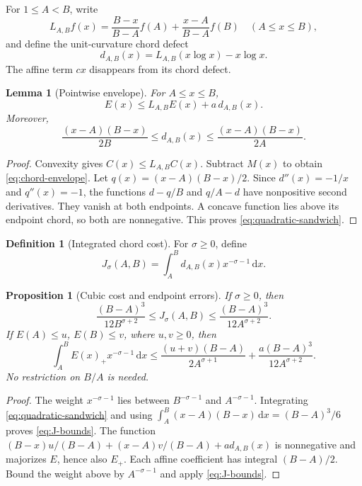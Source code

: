 \documentclass[11pt]{article}
\newtheorem{lemma}[theorem]{Lemma}
\newtheorem{proposition}[theorem]{Proposition}
\theoremstyle{definition}
\newtheorem{definition}[theorem]{Definition}
\newcommand{\dd}{\,\mathrm d}
\begin{document}
For \(1\leq A<B\), write
\[
 L_{A,B}f(x)=\frac{B-x}{B-A}f(A)+\frac{x-A}{B-A}f(B)
 \quad(A\leq x\leq B),
\]
and define the unit-curvature chord defect
\begin{equation}\label{eq:chord-defect}
 d_{A,B}(x)=L_{A,B}(x\log x)-x\log x.
\end{equation}
The affine term \(cx\) disappears from its chord defect.

\begin{lemma}[Pointwise envelope]\label{lem:chord}
For \(A\leq x\leq B\),
\begin{equation}\label{eq:chord-envelope}
 E(x)\leq L_{A,B}E(x)+a\,d_{A,B}(x).
\end{equation}
Moreover,
\begin{equation}\label{eq:quadratic-sandwich}
 \frac{(x-A)(B-x)}{2B}\leq d_{A,B}(x)
 \leq\frac{(x-A)(B-x)}{2A}.
\end{equation}
\end{lemma}
\begin{proof}
Convexity gives \(C(x)\leq L_{A,B}C(x)\). Subtract \(M(x)\) to
obtain \eqref{eq:chord-envelope}. Let \(q(x)=(x-A)(B-x)/2\).
Since \(d''(x)=-1/x\) and \(q''(x)=-1\), the functions
\(d-q/B\) and \(q/A-d\) have nonpositive second derivatives.
They vanish at both endpoints. A concave function lies above its
endpoint chord, so both are nonnegative. This proves
\eqref{eq:quadratic-sandwich}.
\end{proof}

\begin{definition}[Integrated chord cost]
For \(\sigma\geq0\), define
\begin{equation}\label{eq:J-def}
 J_\sigma(A,B)=\int_A^B d_{A,B}(x)x^{-\sigma-1}\dd x.
\end{equation}
\end{definition}

\begin{proposition}[Cubic cost and endpoint errors]\label{prop:cost}
If \(\sigma\geq0\), then
\begin{equation}\label{eq:J-bounds}
 \frac{(B-A)^3}{12B^{\sigma+2}}
 \leq J_\sigma(A,B)
 \leq\frac{(B-A)^3}{12A^{\sigma+2}}.
\end{equation}
If \(E(A)\leq u\), \(E(B)\leq v\), where \(u,v\geq0\), then
\begin{equation}\label{eq:integral-budget}
 \int_A^B E(x)_+x^{-\sigma-1}\dd x
 \leq\frac{(u+v)(B-A)}{2A^{\sigma+1}}
       +\frac{a(B-A)^3}{12A^{\sigma+2}}.
\end{equation}
No restriction on \(B/A\) is needed.
\end{proposition}
\begin{proof}
The weight \(x^{-\sigma-1}\) lies between \(B^{-\sigma-1}\) and
\(A^{-\sigma-1}\). Integrating \eqref{eq:quadratic-sandwich} and using
\(\int_A^B(x-A)(B-x)\dd x=(B-A)^3/6\) proves \eqref{eq:J-bounds}.
The function
\((B-x)u/(B-A)+(x-A)v/(B-A)+ad_{A,B}(x)\) is nonnegative and
majorizes \(E\), hence also \(E_+\). Each affine coefficient has integral
\((B-A)/2\). Bound the weight above by \(A^{-\sigma-1}\) and apply
\eqref{eq:J-bounds}.
\end{proof}
\end{document}
